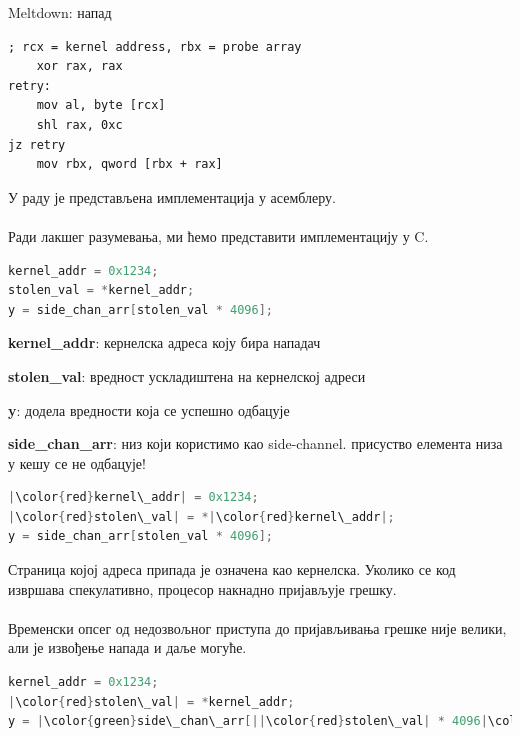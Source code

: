 \documentclass[xcolor=table]{beamer}
\begin{document}
    \begin{frame}{Meltdown: напад}
        \begin{lstlisting}[language={[x86masm]Assembler},frame=single]
; rcx = kernel address, rbx = probe array
    xor rax, rax
retry:
    mov al, byte [rcx]
    shl rax, 0xc
jz retry
    mov rbx, qword [rbx + rax]
        \end{lstlisting}
        
        У раду је представљена имплементација у асемблеру.
        \\~\\
        Ради лакшег разумевања, ми ћемо представити имплементацију у C.
        
        \framebreak
        \begin{lstlisting}[language=c,frame=single]
kernel_addr = 0x1234;
stolen_val = *kernel_addr;
y = side_chan_arr[stolen_val * 4096];
        \end{lstlisting}
        
        \textbf{kernel\_addr}: кернелска адреса коју бира нападач
        
        \textbf{stolen\_val}: вредност ускладиштена на кернелској адреси
        
        \textbf{y}: додела вредности која се успешно одбацује
        
        \textbf{side\_chan\_arr}: низ који користимо као side-channel. присуство елемента низа у кешу се не одбацује!
        
        \framebreak
        \begin{lstlisting}[language=c,frame=single]
|\color{red}kernel\_addr| = 0x1234;
|\color{red}stolen\_val| = *|\color{red}kernel\_addr|;
y = side_chan_arr[stolen_val * 4096];
        \end{lstlisting}
        
        Страница којој адреса припада је означена као кернелска. Уколико се код извршава спекулативно, процесор накнадно пријављује грешку.
        \\~\\
        Временски опсег од недозвољног приступа до пријављивања грешке није велики, али је извођење напада и даље могуће.
        
        \framebreak
        \begin{lstlisting}[language=c,frame=single]
kernel_addr = 0x1234;
|\color{red}stolen\_val| = *kernel_addr;
y = |\color{green}side\_chan\_arr[||\color{red}stolen\_val| * 4096|\color{green}]|;
        \end{lstlisting}
        

\end{frame}
\end{document}
